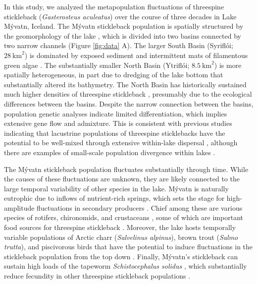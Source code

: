 \documentclass[11pt]{article}
\begin{document}
In this study, 
we analyzed the metapopulation fluctuations of threespine stickleback 
(\textit{Gasterosteus aculeatus})
over the course of three decades in Lake M\'{y}vatn, Iceland.
The M\'{y}vatn stickleback population is spatially structured by the geomorphology
of the lake \citep{gislason1998, millet2013}, 
which is divided into two basins connected by two narrow channels 
(Figure \ref{fig:data} A).
The larger South Basin (Sy{\dh}rifl\'{o}i; $28~\textrm{km}^2$)  
is dominated by exposed sediment and intermittent mats of filamentous green algae
\citep{einarsson2004myvatn}.
The substantially smaller North Basin (Ytrifl\'{o}i; $8.5~\textrm{km}^2$) 
is more spatially heterogeneous, 
in part due to dredging of the lake bottom
that substantially altered its bathymetry.
The North Basin has historically sustained much higher
densities of threespine stickleback  \citep{gislason1998}, 
presumably due to the ecological differences between the basins. 
Despite the narrow connection between the basins, 
population genetic \citep{millet2013} 
analyses indicate limited differentiation,
which implies extensive gene flow and admixture.
This is consistent with previous studies indicating that lacustrine populations
of threespine sticklebacks have the potential to be  
well-mixed through extensive within-lake dispersal
\citep{bolnick2009phenotype},
although there are examples of small-scale population divergence
within lakes \citep{maciejewski2020microhabitat}.

The M\'{y}vatn stickleback population fluctuates substantially through time.
While the causes of these fluctuations are unknown, 
they are likely connected to the large temporal variability 
of other species in the lake.
M\'{y}vatn is naturally eutrophic due to inflows of nutrient-rich springs,
which sets the stage for high-amplitude fluctuations in secondary producers
\citep{einarsson2004myvatn}.
Chief among these are various species of rotifers, chironomids, and crustaceans
\citep{einarsson2002, einarsson2004clad, gardarsson2004population, ives2008},
some of which are important food sources for threespine stickleback
\citep{gudmundsson1996}.
Moreover, the lake hosts temporally variable populations 
of Arctic charr (\textit{Salvelinus alpinus}), 
brown trout (\textit{Salmo trutta}), 
and piscivorous birds that have the potential 
to induce fluctuations in the stickleback population from the top down
\citep{gardarsson1979waterfowl, gudbergsson2004}.
Finally, M\'{y}vatn's stickleback can sustain high loads of the tapeworm
\textit{Schistocephalus solidus} \citep{gislason1998, karvonen2013},
which substantially reduce fecundity in other threespine stickleback populations 
\citep{heins2010evolutionary, heins2012fecundity}.
\end{document}
